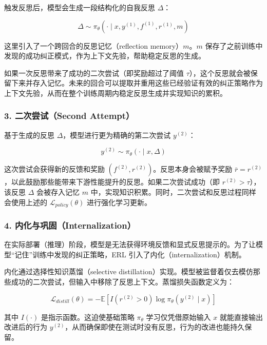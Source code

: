 触发反思后，模型会生成一段结构化的自我反思 \(\Delta\)：

\[
\Delta \sim \pi_\theta(\cdot \mid x, y^{(1)}, f^{(1)}, r^{(1)}, m)
\]

这里引入了一个跨回合的反思记忆（reflection memory）\(m\)。\(m\) 保存了之前训练中发现的成功纠正模式，作为上下文先验，帮助稳定反思的生成。

如果一次反思带来了成功的二次尝试（即奖励超过了阈值 \(\tau\)），这个反思就会被保留下来并存入记忆。未来的回合可以提取并重用这些已经验证有效的纠正策略作为上下文先验，从而在整个训练周期内稳定反思生成并实现知识的累积。

\hypertarget{ux4e8cux6b21ux5c1dux8bd5second-attempt}{%
\subsubsection{3. 二次尝试（Second Attempt）}\label{ux4e8cux6b21ux5c1dux8bd5second-attempt}}

基于生成的反思 \(\Delta\)，模型进行更为精确的第二次尝试 \(y^{(2)}\)：

\[
y^{(2)} \sim \pi_\theta(\cdot \mid x, \Delta)
\]

这次尝试会获得新的反馈和奖励 \((f^{(2)}, r^{(2)})\)。反思本身会被赋予奖励 \(\bar{r} = r^{(2)}\)，以此鼓励那些能带来下游性能提升的反思。如果二次尝试成功（即 \(r^{(2)} > \tau\)），该反思 \(\Delta\) 会被存入记忆 \(m\) 中，实现知识积累。同时，二次尝试和反思过程同样会使用上述的 \(\mathcal{L}_{policy}(\theta)\) 进行强化学习更新。

\hypertarget{ux5185ux5316ux4e0eux5de9ux56fainternalization}{%
\subsubsection{4. 内化与巩固（Internalization）}\label{ux5185ux5316ux4e0eux5de9ux56fainternalization}}

在实际部署（推理）阶段，模型是无法获得环境反馈和显式反思提示的。为了让模型``记住''训练中发现的纠正策略，ERL 引入了内化（internalization）机制。

内化通过选择性知识蒸馏（selective distillation）实现。模型被监督着仅去模仿那些成功的二次尝试，但输入中移除了反思上下文。蒸馏损失函数定义为：

\[
\mathcal{L}_{distill}(\theta) = -\mathbb{E}[I(r^{(2)} > 0) \log \pi_\theta(y^{(2)} \mid x)]
\]

其中 \(I(\cdot)\) 是指示函数。这迫使基础策略 \(\pi_\theta\) 学习仅凭借原始输入 \(x\) 就能直接输出改进后的行为 \(y^{(2)}\)，从而确保即使在测试时没有反思，行为的改进也能持久保留。

